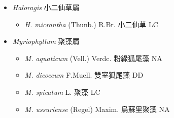 
  \begin{itemize}
 \item[] \textit{Haloragis} 小二仙草屬
                                
  \begin{itemize}
        \item[] \textit{H. micrantha} (Thunb.) R.Br.  小二仙草   LC
  \end{itemize}
 \item[] \textit{Myriophyllum} 聚藻屬
                                
  \begin{itemize}
        \item[] \textit{M. aquaticum} (Vell.) Verdc.  粉綠狐尾藻   NA
        \item[] \textit{M. dicoccum} F.Muell.  雙室狐尾藻   DD
        \item[] \textit{M. spicatum} L.  聚藻   LC
        \item[] \textit{M. ussuriense} (Regel) Maxim.  烏蘇里聚藻   NA
  \end{itemize}
  \end{itemize}

